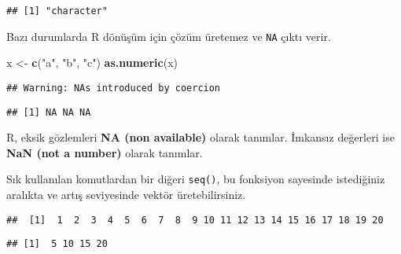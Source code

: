 \documentclass[
]{book}
\newenvironment{Shaded}{\begin{snugshade}}{\end{snugshade}}
\newcommand{\CommentTok}[1]{\textcolor[rgb]{0.56,0.35,0.01}{\textit{#1}}}
\newcommand{\DataTypeTok}[1]{\textcolor[rgb]{0.13,0.29,0.53}{#1}}
\newcommand{\DecValTok}[1]{\textcolor[rgb]{0.00,0.00,0.81}{#1}}
\newcommand{\KeywordTok}[1]{\textcolor[rgb]{0.13,0.29,0.53}{\textbf{#1}}}
\newcommand{\NormalTok}[1]{#1}
\newcommand{\OperatorTok}[1]{\textcolor[rgb]{0.81,0.36,0.00}{\textbf{#1}}}
\newcommand{\StringTok}[1]{\textcolor[rgb]{0.31,0.60,0.02}{#1}}
\begin{document}
\begin{verbatim}
## [1] "character"
\end{verbatim}

Bazı durumlarda R dönüşüm için çözüm üretemez ve \texttt{NA} çıktı verir.

\begin{Shaded}
\begin{Highlighting}[]
\NormalTok{x <-}\StringTok{ }\KeywordTok{c}\NormalTok{(}\StringTok{"a"}\NormalTok{, }\StringTok{"b"}\NormalTok{, }\StringTok{"c"}\NormalTok{)}
\KeywordTok{as.numeric}\NormalTok{(x)}
\end{Highlighting}
\end{Shaded}

\begin{verbatim}
## Warning: NAs introduced by coercion
\end{verbatim}

\begin{verbatim}
## [1] NA NA NA
\end{verbatim}

R, eksik gözlemleri \textbf{NA (non available)} olarak tanımlar. İmkansız değerleri ise \textbf{NaN (not a number)} olarak tanımlar.

Sık kullanılan komutlardan bir diğeri \texttt{seq()}, bu fonksiyon sayesinde istediğiniz aralıkta ve artış seviyesinde vektör üretebilirsiniz.

\begin{Shaded}
\end{Shaded}

\begin{verbatim}
##  [1]  1  2  3  4  5  6  7  8  9 10 11 12 13 14 15 16 17 18 19 20
\end{verbatim}

\begin{Shaded}
\end{Shaded}

\begin{verbatim}
## [1]  5 10 15 20
\end{verbatim}
\end{document}
